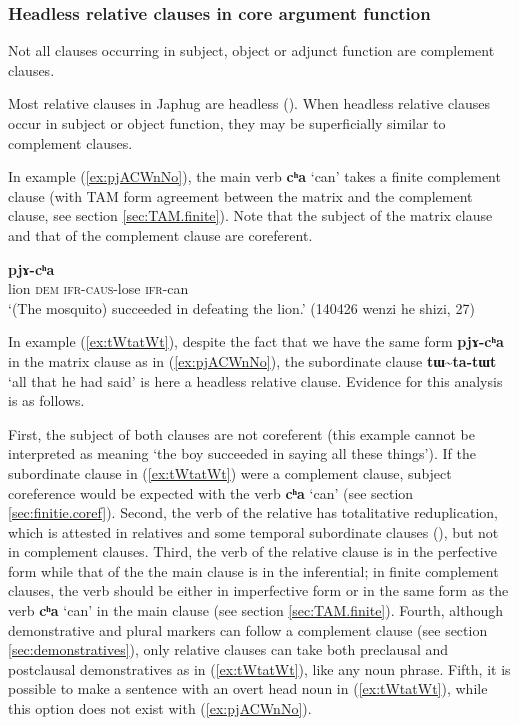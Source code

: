 \documentclass[oneside,a4paper,11pt]{article}
\newcommand{\ipa}[1]{\textbf{\phon#1}} %
\newcommand{\jpg}[2]{\ipa{#1} `#2'} %
\newcommand{\tld}{\textasciitilde{}}
\begin{document}
  \subsubsection{Headless relative clauses in core argument function}   \label{sec:relative}
Not all clauses occurring in subject, object or adjunct function are complement clauses. 

Most relative clauses in Japhug are headless  (\citealt{jacques16relatives}). When headless relative clauses occur in subject or object function, they may be superficially similar to complement clauses.

In example (\ref{ex:pjACWnNo}), the main verb \jpg{cʰa}{can} takes a finite complement clause (with TAM form agreement between the matrix and the complement clause, see section \ref{sec:TAM.finite}). Note that the subject of the matrix clause and that of the complement clause are coreferent.

\begin{exe}
\ex \label{ex:pjACWnNo}
\gll [\ipa{sɯŋgi} 	\ipa{nɯ} 	\ipa{pjɤ-ɕɯ-nŋo}] 	\ipa{pjɤ-cʰa} \\
lion \textsc{dem} \textsc{ifr-caus}-lose \textsc{ifr}-can \\
\glt `(The mosquito) succeeded in defeating the lion.' (140426 wenzi he shizi, 27)
\end{exe}

In example (\ref{ex:tWtatWt}), despite the fact that we have the same form \ipa{pjɤ-cʰa} in the matrix clause as in (\ref{ex:pjACWnNo}), the subordinate clause \ipa{tɯ\tld{}ta-tɯt} `all that he had said' is here a headless relative clause. Evidence for this analysis is as follows.

 First, the subject of both clauses are not coreferent (this example cannot be interpreted as meaning `the boy succeeded in saying all these things'). If the subordinate clause in (\ref{ex:tWtatWt}) were a complement clause, subject coreference would be expected with the verb 
\jpg{cʰa}{can} (see section \ref{sec:finitie.coref}). Second, the verb of the relative has totalitative reduplication, which is attested in relatives and some temporal subordinate clauses (\citealt[295]{jacques14linking}), but not in complement clauses. Third, the verb of the relative clause is in the perfective form while that of the the main clause is in the inferential; in finite complement clauses, the verb should be either in imperfective form or in the same form as the verb \jpg{cʰa}{can} in the main clause (see section \ref{sec:TAM.finite}). Fourth, although demonstrative and plural markers can follow a complement clause (see section \ref{sec:demonstratives}), only relative clauses can take both preclausal and postclausal demonstratives as in (\ref{ex:tWtatWt}), like any noun phrase. Fifth, it is possible to make a sentence with an overt head noun in (\ref{ex:tWtatWt}), while this option does not exist with (\ref{ex:pjACWnNo}). 
\end{document}
